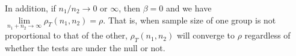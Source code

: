 \documentclass[12pt, a4paper]{article}
\newtheorem{corollary}{corollary}
\newcommand{\cor}{\text{Corr}}
\begin{document}
In addition, if $n_1/n_2\rightarrow 0$ or $\infty$, then $\beta = 0$ and we have 
$\lim\limits_{n_1+n_2\rightarrow\infty}\rho_T(n_1, n_2) =\rho$. That is, when sample size of one 
group is not 
proportional to that of the other, 
$\rho_T(n_1, n_2)$ will converge to $\rho$ regardless of whether the tests are under the null or 
not. 	

\end{document}
